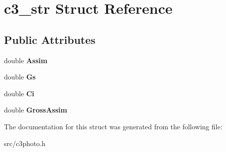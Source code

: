 \hypertarget{structc3__str}{\section{c3\-\_\-str Struct Reference}
\label{structc3__str}
}
\subsection*{Public Attributes}
\begin{DoxyCompactItemize}
\item 
\hypertarget{structc3__str_a859d76f4c4e8c6a96e34e9b99f2857dc}{double {\bfseries Assim}}\label{structc3__str_a859d76f4c4e8c6a96e34e9b99f2857dc}

\item 
\hypertarget{structc3__str_a2fcc3787ac1ca5dd5be990fc00fb92f6}{double {\bfseries Gs}}\label{structc3__str_a2fcc3787ac1ca5dd5be990fc00fb92f6}

\item 
\hypertarget{structc3__str_a2a12fc78a3acec1015b347ca5942cc73}{double {\bfseries Ci}}\label{structc3__str_a2a12fc78a3acec1015b347ca5942cc73}

\item 
\hypertarget{structc3__str_a0d2c3391dcf87e250d4f95b44c3bc0e6}{double {\bfseries Gross\-Assim}}\label{structc3__str_a0d2c3391dcf87e250d4f95b44c3bc0e6}

\end{DoxyCompactItemize}


The documentation for this struct was generated from the following file\-:\begin{DoxyCompactItemize}
\item 
src/c3photo.\-h\end{DoxyCompactItemize}
